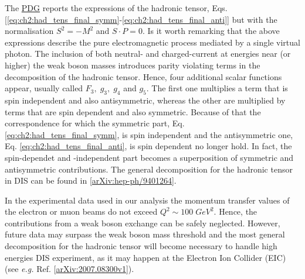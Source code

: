 The \href{https://pdg.lbl.gov/2019/reviews/rpp2019-rev-structure-functions.pdf}{PDG} reports the expressions of the hadronic tensor, Eqs. [\ref{eq:ch2:had_tens_final_symm}-\ref{eq:ch2:had_tens_final_anti}] but with the normalisation $S^2 = - M^2$ and $S \cdot P = 0$. Is it worth remarking that the above expressions describe the pure electromagnetic process mediated by a single virtual photon. The inclusion of both neutral- and charged-current at energies near (or higher) the weak boson masses introduces parity violating terms in the decomposition of the hadronic tensor. Hence, four additional scalar functions appear, usually called $F_3, \; g_3,\; g_4$ and $g_5$. The first one multiplies a term that is spin independent and also antisymmetric, whereas the other are multiplied by terms that are spin dependent and also symmetric. Because of that the correspondence for which the symmetric part, Eq. \eqref{eq:ch2:had_tens_final_symm}, is spin independent and the antisymmetric one, Eq. \eqref{eq:ch2:had_tens_final_anti}, is spin dependent no longer hold. In fact, the spin-dependet and -independent part becomes a superposition of symmetric and antisymmetric contributions. The general decomposition for the hadronic tensor in DIS can be found in [\href{https://arxiv.org/abs/hep-ph/9401264}{arXiv:hep-ph/9401264}].\par
In the experimental data used in our analysis the momentum transfer values of the electron or muon beams do not exceed  $Q^2 \sim 100 \; GeV^2$. Hence, the contributions from a weak boson exchange can be safely neglected. However, future data may surpass the weak boson mass threshold and the most general decomposition for the hadronic tensor will become necessary to handle high energies DIS experiment, as it may happen at the Electron Ion Collider (EIC) (see \textit{e.g.} Ref. [\href{https://arxiv.org/abs/2007.08300v1}{arXiv:2007.08300v1}]).\par

